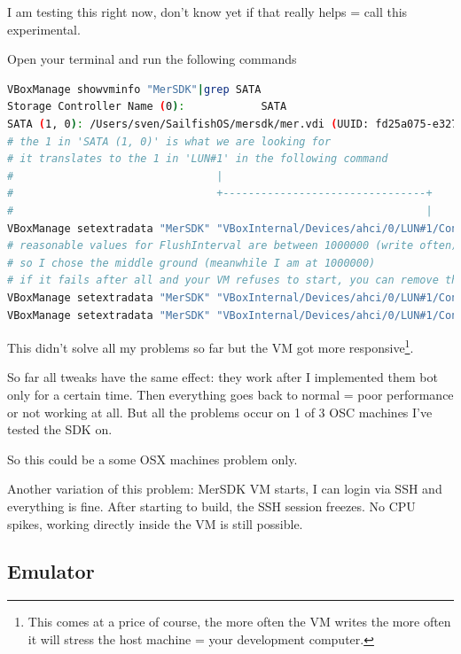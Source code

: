 I am testing this right now, don't know yet if that really helps = call this experimental.

Open your terminal and run the following commands
%
\begin{lstlisting}[language=bash]
VBoxManage showvminfo "MerSDK"|grep SATA
Storage Controller Name (0):            SATA
SATA (1, 0): /Users/sven/SailfishOS/mersdk/mer.vdi (UUID: fd25a075-e327-46b6-8657-3ab4c4294f94)
# the 1 in 'SATA (1, 0)' is what we are looking for
# it translates to the 1 in 'LUN#1' in the following command
#                                |
#                                +--------------------------------+
#                                                                 |
VBoxManage setextradata "MerSDK" "VBoxInternal/Devices/ahci/0/LUN#1/Config/FlushInterval" 5000000
# reasonable values for FlushInterval are between 1000000 (write often) and 10000000 (write bigger chunks)
# so I chose the middle ground (meanwhile I am at 1000000)
# if it fails after all and your VM refuses to start, you can remove the value with
VBoxManage setextradata "MerSDK" "VBoxInternal/Devices/ahci/0/LUN#1/Config/FlushInterval"
VBoxManage setextradata "MerSDK" "VBoxInternal/Devices/ahci/0/LUN#1/Config/IgnoreFlush"
\end{lstlisting}
%
This didn't solve all my problems so far but the VM got more responsive\footnote{This comes at a price of course, the more often the VM writes the more often it will stress the host machine = your development computer.}.

So far all tweaks have the same effect: they work after I implemented them bot only for a certain time. Then everything goes back to normal =  poor performance or not working at all. But all the problems occur on 1 of 3 OSC machines I've tested the SDK on.

So this could be a some OSX machines problem only.

Another variation of this problem: MerSDK VM starts, I can login via SSH and everything is fine. After starting to build, the SSH session freezes. No CPU spikes, working directly inside the VM is still possible.
%
%
\subsection{Emulator}
%
%
